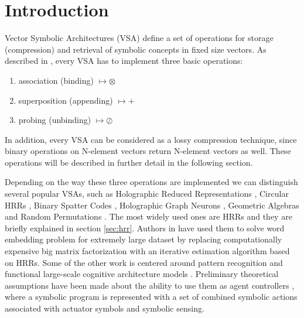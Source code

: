 \documentclass[conference]{IEEEtran}
\begin{document}
	
	
	\section{Introduction}
	
	Vector Symbolic Architectures (VSA) define a set of operations for storage (compression) and retrieval of symbolic concepts in fixed size vectors.
As described in \cite{Levy:2008:VectorSymbolicArchitectures}, every VSA has to implement three basic operations:
	\begin{enumerate}
		\item association (binding) $\mapsto \otimes$
		\item superposition (appending) $\mapsto +$
		\item probing (unbinding) $\mapsto \oslash$
	\end{enumerate}
	
	In addition, every VSA can be considered as a lossy compression technique, since binary operations on N-element vectors return N-element vectors as well. These operations will be described in further detail in the following section. 
	
	Depending on the way these three operations are implemented we can distinguish several popular VSAs, such as Holographic Reduced Representations \cite{Plate:1995:HolographicReducedRepresentations}, Circular HRRs \cite{DeVine:2010:Semanticoscillations}, Binary Spatter Codes \cite{Kanerva:1994:SpatterCodeEncoding}, Holographic Graph Neurons \cite{Kleyko:2016:HolographicGraphNeuron}, Geometric Algebras \cite{Patyk-Lonska:2011:DistributedRepresentationsBased} and Random Permutations \cite{Recchia:2015:EncodingSequentialInformation}.
The most widely used ones are HRRs and they are briefly explained in section \ref{sec:hrr}.
Authors in \cite{Golosio:2015:CognitiveNeuralArchitecture} have used them to solve word embedding problem for extremely large dataset by replacing computationally expensive big matrix factorization with an iterative estimation algorithm based on HRRs.
Some of the other work is centered around pattern recognition \cite{Kleyko:2016:PatternRecognitionVector} and functional large-scale cognitive architecture models \cite{Eliasmith:2012:LargeScaleModel}.
Preliminary theoretical assumptions have been made about the ability to use them as agent controllers \cite{Levy:2013:LearningBehaviorHierarchies}, where a symbolic program is represented with a set of combined symbolic actions associated with actuator symbols and symbolic sensing.
	
\end{document}
